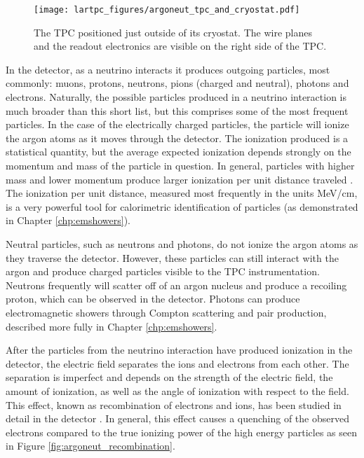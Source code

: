 \begin{figure}[htbp]
  \centering
  \texttt{[image: lartpc\_figures/argoneut\_tpc\_and\_cryostat.pdf]}
  \caption[The \argoneut TPC]{The \argoneut TPC positioned just outside of its cryostat.  The wire planes and the readout electronics are visible on the right side of the TPC.}
  \label{fig:argoneut_tpc}
\end{figure}

In the detector, as a neutrino interacts it produces outgoing particles, most commonly: muons, protons, neutrons, pions (charged and neutral), photons and electrons.  Naturally, the possible particles produced in a neutrino interaction is much broader than this short list, but this comprises some of the most frequent particles.  In the case of the electrically charged particles, the particle will ionize the argon atoms as it moves through the detector.  The ionization produced is a statistical quantity, but the average expected ionization depends strongly on the momentum and mass of the particle in question.  In general, particles with higher mass and lower momentum produce larger ionization per unit distance traveled \cite{Kalinovsky:1989kk}.  The ionization per unit distance, measured most frequently in the units MeV/cm, is a very powerful tool for calorimetric identification of particles (as demonstrated in Chapter \ref{chp:emshowers}).

Neutral particles, such as neutrons and photons, do not ionize the argon atoms as they traverse the detector.  However, these particles can still interact with the argon and produce charged particles visible to the TPC instrumentation.  Neutrons frequently will scatter off of an argon nucleus and produce a recoiling proton, which can be observed in the detector.  Photons can produce electromagnetic showers through Compton scattering and pair production, described more fully in Chapter \ref{chp:emshowers}.

After the particles from the neutrino interaction have produced ionization in the detector, the electric field separates the ions and electrons from each other.  The separation is imperfect and depends on the strength of the electric field, the amount of ionization, as well as the angle of ionization with respect to the field.  This effect, known as recombination of electrons and ions, has been studied in detail in the \argoneut detector \cite{Acciarri:2013met}.  In general, this effect causes a quenching of the observed electrons compared to the true ionizing power of the high energy particles as seen in Figure \ref{fig:argoneut_recombination}.


